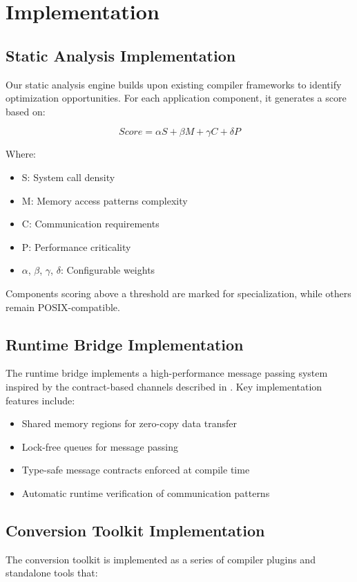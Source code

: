 \documentclass[conference]{IEEEtran}
\begin{document}
\section{Implementation}
\subsection{Static Analysis Implementation}
Our static analysis engine builds upon existing compiler frameworks to identify optimization opportunities. For each application component, it generates a score based on:

\begin{equation}
	Score = \alpha S + \beta M + \gamma C + \delta P
\end{equation}

Where:
\begin{itemize}
	\item S: System call density
	\item M: Memory access patterns complexity
	\item C: Communication requirements
	\item P: Performance criticality
	\item $\alpha$, $\beta$, $\gamma$, $\delta$: Configurable weights
\end{itemize}

Components scoring above a threshold are marked for specialization, while others remain POSIX-compatible.

\subsection{Runtime Bridge Implementation}
The runtime bridge implements a high-performance message passing system inspired by the contract-based channels described in \cite{linux_kernel_clothing}. Key implementation features include:

\begin{itemize}
	\item Shared memory regions for zero-copy data transfer
	\item Lock-free queues for message passing
	\item Type-safe message contracts enforced at compile time
	\item Automatic runtime verification of communication patterns
\end{itemize}

\subsection{Conversion Toolkit Implementation}
The conversion toolkit is implemented as a series of compiler plugins and standalone tools that:
\end{document}
